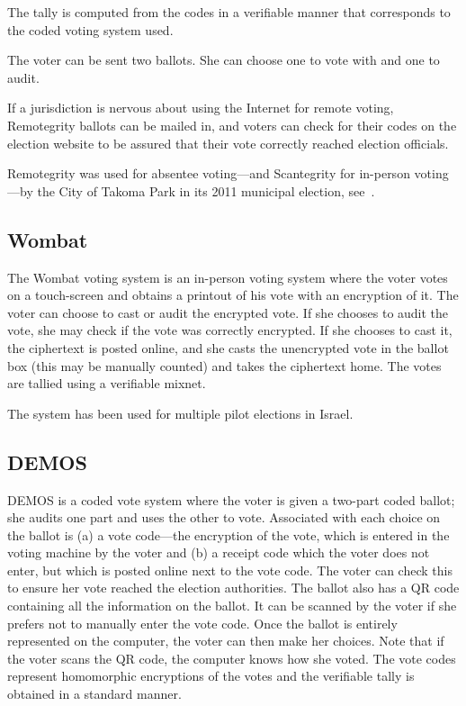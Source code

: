 The tally is computed from the codes in a verifiable manner that corresponds
to the coded voting system used.

The voter can be sent two ballots. She can choose one to vote with and one
to audit.

If a jurisdiction is nervous about using the Internet for remote voting,
Remotegrity ballots can be mailed in, and voters can check for their codes
on the election website to be assured that their vote correctly reached
election officials.

Remotegrity was used for absentee voting---and Scantegrity for in-person
voting---by the City of Takoma Park in its 2011 municipal election,
see~\cite{zagorski2013}.

\subsection{Wombat~\cite{rosen2011}}

The Wombat voting system is an in-person voting system where the voter votes
on a touch-screen and obtains a printout of his vote with an encryption of
it. The voter can choose to cast or audit the encrypted vote. If she chooses
to audit the vote, she may check if the vote was correctly encrypted. If she
chooses to cast it, the ciphertext is posted online, and she casts the
unencrypted vote in the ballot box (this may be manually counted) and takes
the ciphertext home. The votes are tallied using a verifiable mixnet.

The system has been used for multiple pilot elections in Israel.

\subsection{DEMOS~\cite{kiayias2014}}

DEMOS is a coded vote system where the voter is given a two-part coded
ballot; she audits one part and uses the other to vote. Associated with each
choice on the ballot is (a) a vote code---the encryption of the vote, which
is entered in the voting machine by the voter and (b) a receipt code which
the voter does not enter, but which is posted online next to the vote code.
The voter can check this to ensure her vote reached the election
authorities. The ballot also has a QR code containing all the information on
the ballot. It can be scanned by the voter if she prefers not to manually
enter the vote code. Once the ballot is entirely represented on the
computer, the voter can then make her choices. Note that if the voter scans
the QR code, the computer knows how she voted. The vote codes represent
homomorphic encryptions of the votes and the verifiable tally is obtained in
a standard manner.

